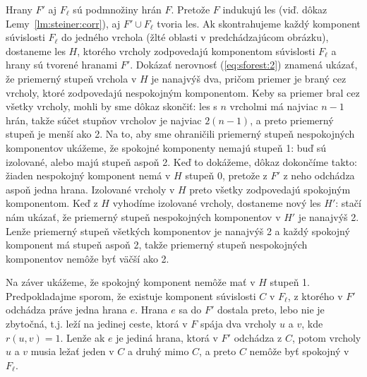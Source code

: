\begin{dokaz}
\noindent
Hrany $F'$ aj $F_\ell$ sú podmnožiny hrán $F$. Pretože $F$ indukujú les (viď. dôkaz Lemy~\ref{lm:steiner:corr}),
aj $F'\cup F_\ell$ tvoria les. Ak skontrahujeme každý komponent súvislosti $F_\ell$ do jedného vrchola (žlté
oblasti v predchádzajúcom obrázku), dostaneme les $H$, ktorého vrcholy zodpovedajú komponentom súvislosti $F_\ell$ a
hrany sú tvorené hranami $F'$. Dokázať nerovnosť   (\ref{eq:sforest:2}) znamená ukázať, že priemerný stupeň
vrchola v $H$ je nanajvýš dva, pričom priemer je braný cez vrcholy, ktoré zodpovedajú nespokojným komponentom.
Keby sa priemer bral cez všetky vrcholy, mohli by sme dôkaz skončiť: les s $n$ vrcholmi má najviac $n-1$ hrán,
takže súčet stupňov vrcholov je najviac $2(n-1)$, a preto priemerný stupeň je menší ako 2. 
Na to, aby sme ohraničili priemerný stupeň nespokojných komponentov ukážeme, že spokojné
komponenty nemajú stupeň 1: buď sú izolované, alebo majú stupeň aspoň 2. 
Keď to dokážeme, dôkaz dokončíme takto: žiaden nespokojný komponent nemá v $H$ stupeň 0, pretože
z $F'$ z neho odchádza aspoň jedna hrana. Izolované vrcholy v $H$ preto všetky zodpovedajú spokojným komponentom.
Keď z $H$ vyhodíme izolované vrcholy, dostaneme nový les $H'$: stačí nám ukázať, že priemerný stupeň 
nespokojných komponentov v $H'$ je nanajvýš 2. Lenže priemerný stupeň všetkých komponentov je nanajvýš 2 a každý
spokojný komponent má stupeň aspoň 2, takže priemerný stupeň nespokojných komponentov nemôže byť väčší ako 2.

Na záver ukážeme, že spokojný komponent nemôže mať v $H$ stupeň 1. Predpokladajme sporom, že existuje
komponent súvislosti $C$ v $F_\ell$, 
z ktorého v $F'$ odchádza práve jedna hrana $e$. Hrana $e$ sa do $F'$ dostala preto,
lebo nie je zbytočná, t.j. leží na jedinej ceste, ktorá v $F$ spája dva vrcholy $u$ a $v$, kde $r(u,v)=1$.
Lenže  ak $e$ je jediná hrana, ktorá v $F'$ odchádza z $C$, potom vrcholy $u$ a $v$ musia ležať jeden v $C$
a druhý mimo $C$, a preto $C$ nemôže byť spokojný v $F_\ell$.
\end{dokaz}

